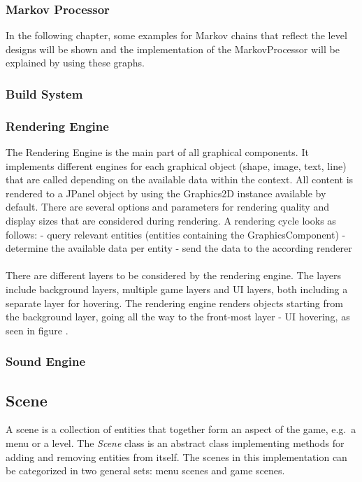 \subsubsection{Markov Processor}\label{subsubsec:example-markov-chains}
In the following chapter, some examples for Markov chains that reflect the level designs will be shown and the implementation of the
MarkovProcessor will be explained by using these graphs.
\subsubsection{Build System}\label{subsubsec:build-system}

\subsubsection{Rendering Engine}\label{subsubsec:graphics-engine}
The Rendering Engine is the main part of all graphical components.
It implements different engines for each graphical object (shape, image, text, line) that are called depending on the available data within the
context.
All content is rendered to a JPanel object by using the Graphics2D instance available by default.
There are several options and parameters for rendering quality and display sizes that are considered during rendering.
A rendering cycle looks as follows:
- query relevant entities (entities containing the GraphicsComponent)
- determine the available data per entity
- send the data to the according renderer
\\ \\
There are different layers to be considered by the rendering engine.
The layers include background layers, multiple game layers and UI layers, both including a separate layer for hovering.
The rendering engine renders objects starting from the background layer, going all the way to the front-most layer - UI hovering, as seen in figure
.

\subsubsection{Sound Engine}\label{subsubsec:sound-engine}

\subsection{Scene}\label{subsec:scenes}
A scene is a collection of entities that together form an aspect of the game, e.g.\ a menu or a level.
The \textit{Scene} class is an abstract class implementing methods for adding and removing entities from itself.
The scenes in this implementation can be categorized in two general sets: menu scenes and game scenes.

